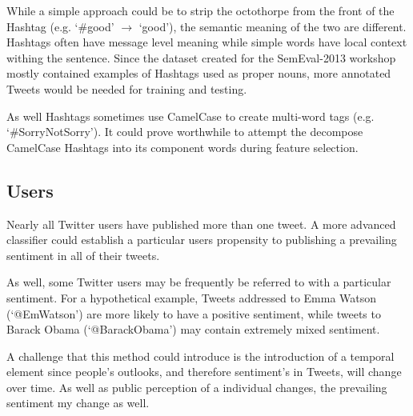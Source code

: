 \documentclass[12pt]{article}
\begin{document}
While a simple approach could be to strip the octothorpe from the front of the
Hashtag (e.g. `\#good' $\rightarrow$ `good'), the semantic meaning of the two
are different. Hashtags often have message level meaning while simple words
have local context withing the sentence. Since the dataset created for the
SemEval-2013 workshop mostly contained examples of Hashtags used as proper
nouns, more annotated Tweets would be needed for training and testing.

As well Hashtags sometimes use CamelCase to create multi-word tags (e.g.
`\#SorryNotSorry'). It could prove worthwhile to attempt the decompose
CamelCase Hashtags into its component words during feature selection.

\subsection{Users}

Nearly all Twitter users have published more than one tweet. A more advanced
classifier could establish a particular users propensity to publishing a
prevailing sentiment in all of their tweets.

As well, some Twitter users may be frequently be referred to with a particular
sentiment. For a hypothetical example, Tweets addressed to Emma Watson
(`@EmWatson') are more likely to have a positive sentiment, while tweets to
Barack Obama (`@BarackObama') may contain extremely mixed sentiment.

A challenge that this method could introduce is the introduction of a temporal
element since people's outlooks, and therefore sentiment's in Tweets, will
change over time. As well as public perception of a individual changes, the
prevailing sentiment my change as well.


\nocite{*}


\end{document}
